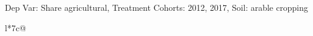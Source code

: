\begin{table}[H]
\captionlistentry[table]{}
\label{table:beaver_land_class_DVis_land_class_1_SCg12_SSAC}
\scriptsize %
Dep Var: Share agricultural, Treatment Cohorts: 2012, 2017, Soil: arable cropping \\
\begin{threeparttable}
\begin{tabulary}{\textwidth}{l*{7}{c}@{}}
\toprule \toprule
\noalign{\smallskip}
\noalign{\smallskip}
\midrule \bottomrule
\end{tabulary}
\medskip
\end{threeparttable}
\end{table}
